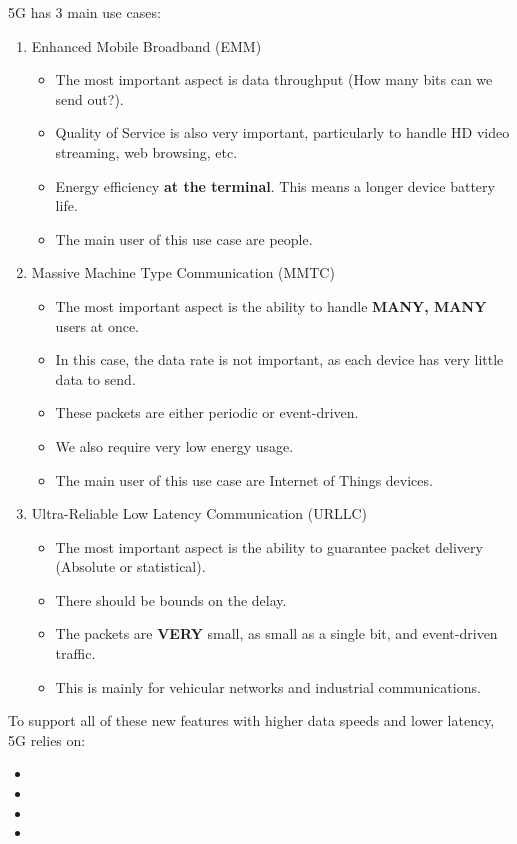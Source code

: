 5G has 3 main use cases:
\begin{enumerate}[noitemsep]
\item Enhanced Mobile Broadband (EMM)
  \begin{itemize}[noitemsep]
  \item The most important aspect is data throughput (How many bits can we send out?).
  \item Quality of Service is also very important, particularly to handle HD video streaming, web browsing, etc.
  \item Energy efficiency \textbf{at the terminal}. This means a longer device battery life.
  \item The main user of this use case are people.
  \end{itemize}
\item Massive Machine Type Communication (MMTC)
  \begin{itemize}[noitemsep]
  \item The most important aspect is the ability to handle \textbf{MANY, MANY} users at once.
  \item In this case, the data rate is not important, as each device has very little data to send.
  \item These packets are either periodic or event-driven.
  \item We also require very low energy usage.
  \item The main user of this use case are Internet of Things devices.
  \end{itemize}
\item Ultra-Reliable Low Latency Communication (URLLC)
  \begin{itemize}[noitemsep]
  \item The most important aspect is the ability to guarantee packet delivery (Absolute or statistical).
  \item There should be bounds on the delay.
  \item The packets are \textbf{VERY} small, as small as a single bit, and event-driven traffic.
  \item This is mainly for vehicular networks and industrial communications.
  \end{itemize}
\end{enumerate}

To support all of these new features with higher data speeds and lower latency, 5G relies on:
\begin{itemize}[noitemsep]
\item {}
\item {}
\item {}
\item {}
\end{itemize}

